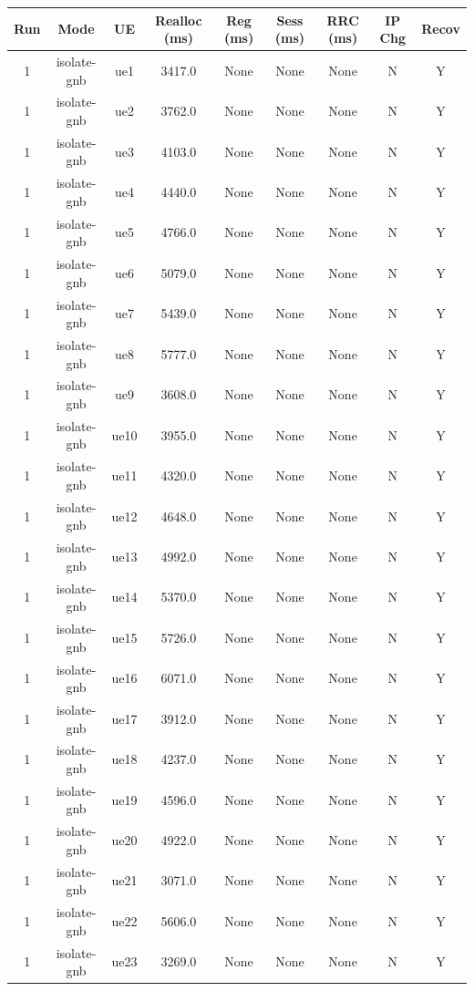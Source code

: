 \begin{table}[ht]
\centering
\begin{tabular}{|c|c|c|c|c|c|c|c|c|}
\hline
Run & Mode & UE & Realloc (ms) & Reg (ms) & Sess (ms) & RRC (ms) & IP Chg & Recov \\
\hline
1 & isolate-gnb & ue1 & 3417.0 & None & None & None & N & Y \\
1 & isolate-gnb & ue2 & 3762.0 & None & None & None & N & Y \\
1 & isolate-gnb & ue3 & 4103.0 & None & None & None & N & Y \\
1 & isolate-gnb & ue4 & 4440.0 & None & None & None & N & Y \\
1 & isolate-gnb & ue5 & 4766.0 & None & None & None & N & Y \\
1 & isolate-gnb & ue6 & 5079.0 & None & None & None & N & Y \\
1 & isolate-gnb & ue7 & 5439.0 & None & None & None & N & Y \\
1 & isolate-gnb & ue8 & 5777.0 & None & None & None & N & Y \\
1 & isolate-gnb & ue9 & 3608.0 & None & None & None & N & Y \\
1 & isolate-gnb & ue10 & 3955.0 & None & None & None & N & Y \\
1 & isolate-gnb & ue11 & 4320.0 & None & None & None & N & Y \\
1 & isolate-gnb & ue12 & 4648.0 & None & None & None & N & Y \\
1 & isolate-gnb & ue13 & 4992.0 & None & None & None & N & Y \\
1 & isolate-gnb & ue14 & 5370.0 & None & None & None & N & Y \\
1 & isolate-gnb & ue15 & 5726.0 & None & None & None & N & Y \\
1 & isolate-gnb & ue16 & 6071.0 & None & None & None & N & Y \\
1 & isolate-gnb & ue17 & 3912.0 & None & None & None & N & Y \\
1 & isolate-gnb & ue18 & 4237.0 & None & None & None & N & Y \\
1 & isolate-gnb & ue19 & 4596.0 & None & None & None & N & Y \\
1 & isolate-gnb & ue20 & 4922.0 & None & None & None & N & Y \\
1 & isolate-gnb & ue21 & 3071.0 & None & None & None & N & Y \\
1 & isolate-gnb & ue22 & 5606.0 & None & None & None & N & Y \\
1 & isolate-gnb & ue23 & 3269.0 & None & None & None & N & Y \\

\end{tabular}
\end{table}
